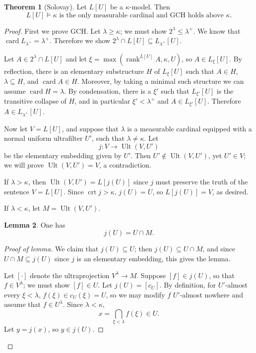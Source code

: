 \documentclass[12pt]{report}
\newcommand{\card}{\operatorname{card}}
\newcommand{\rank}{\operatorname{rank}}
\DeclareMathOperator{\crt}{crt}
\DeclareMathOperator{\Ult}{Ult}
\theoremstyle{definition}
\newtheorem{theorem}{Theorem}[chapter]
\newtheorem{lemma}[theorem]{Lemma}
\begin{document}
\begin{theorem}[Solovay]
Let $L[U]$ be a $\kappa$-model. Then
$$L[U] \models \text{$\kappa$ is the only measurable cardinal and GCH holds above $\kappa$}.$$
\end{theorem}
\begin{proof}
First we prove GCH. Let $\lambda \geq \kappa$; we must show $2^\lambda \leq \lambda^+$.
We know that $\card L_{\lambda^+} = \lambda^+$. Therefore we show $2^\lambda \cap L[U] \subseteq L_{\lambda^+}[U]$.

Let $A \in 2^\lambda \cap L[U]$ and let $\xi = \max(\rank^{L[U]} A, \kappa, U)$, so $A \in L_\xi[U]$.
By reflection, there is an elementary substructure $H$ of $L_\xi[U]$ such that $A \in H$, $\lambda \subseteq H$, and $\card A \in H$.
Moreover, by taking a minimal such structure we can assume $\card H = \lambda$.
By condensation, there is a $\xi'$ such that $L_{\xi'}[U]$ is the transitive collapse of $H$, and in particular $\xi' < \lambda^+$ and $A \in L_{\xi'}[U]$.
Therefore $A \in L_{\lambda^+}[U]$.

Now let $V = L[U]$, and suppose that $\lambda$ is a measurable cardinal equipped with a normal uniform ultrafilter $U'$, such that $\lambda \neq \kappa$.
Let
$$j: V \to \Ult(V, U')$$
be the elementary embedding given by $U'$.
Then $U' \notin \Ult(V, U')$, yet $U' \in V$; we will prove $\Ult(V, U') = V$, a contradiction.

If $\lambda > \kappa$, then $\Ult(V, U') = L[j(U)]$ since $j$ must preserve the truth of the sentence $V = L[U]$. Since $\crt j > \kappa$, $j(U) = U$, so $L[j(U)] = V$, as desired.

If $\lambda < \kappa$, let $M = \Ult(V, U')$.
\begin{lemma}
One has
$$j(U) = U \cap M.$$
\end{lemma}
\begin{proof}[Proof of lemma]
We claim that $j(U) \subseteq U$; then $j(U) \subseteq U \cap M$, and since $U \cap M \subseteq j(U)$ since $j$ is an elementary embedding, this gives the lemma.

Let $[\cdot]$ denote the ultraprojection $V^\lambda \to M$.
Suppose $[f] \in j(U)$, so that $f \in V^\lambda$; we must show $[f] \in U$. Let $j(U) = [c_U]$.
By definition, for $U'$-almost every $\xi < \lambda$, $f(\xi) \in c_U(\xi) = U$, so we may modify $f$ $U'$-almost nowhere and assume that $f \in U^\lambda$.
Since $\lambda < \kappa$,
$$x = \bigcap_{\xi < \lambda} f(\xi) \in U.$$
Let $y = j(x)$, so $y \in j(U)$.


\end{proof}
\end{proof}
\end{document}
